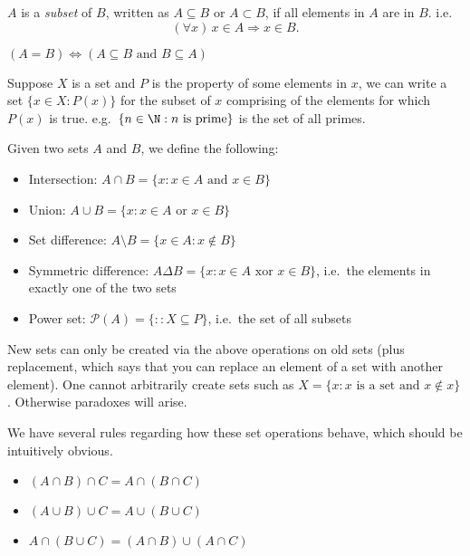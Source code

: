 \documentclass[a4paper]{article}
\begin{document}
\begin{defi}[Subsets]
  $A$ is a \emph{subset} of $B$, written as $A\subseteq B$ or $A\subset B$, if all elements in $A$ are in $B$. i.e.
  \[
    (\forall x)\,x\in A\Rightarrow x\in B.
  \]
\end{defi}

\begin{thm}
  $(A=B)\Leftrightarrow (A\subseteq B \text{ and }B\subseteq A)$
\end{thm}

Suppose $X$ is a set and $P$ is the property of some elements in $x$, we can write a set $\{x\in X:P(x)\}$ for the subset of $x$ comprising of the elements for which $P(x)$ is true. e.g.\ $\{n\in \N : n \text{ is prime}\}$ is the set of all primes.

\begin{defi}
  Given two sets $A$ and $B$, we define the following:
  \begin{itemize}
    \item Intersection: $A\cap B = \{x:x\in A \text{ and } x\in B\}$
    \item Union: $A\cup B = \{x:x\in A\text{ or }x\in B\}$
    \item Set difference: $A\setminus B = \{x\in A: x\not\in B\}$
    \item Symmetric difference: $A\Delta B = \{x: x\in A\text{ xor } x\in B\}$, i.e.\ the elements in exactly one of the two sets
    \item Power set: $\mathcal{P}(A) = \{:: X\subseteq P\}$, i.e.\ the set of all subsets
  \end{itemize}
\end{defi}

New sets can only be created via the above operations on old sets (plus replacement, which says that you can replace an element of a set with another element). One cannot arbitrarily create sets such as $X=\{x:x\text{ is a set and }x\not\in x\}$. Otherwise paradoxes will arise.

We have several rules regarding how these set operations behave, which should be intuitively obvious.
\begin{prop}\leavevmode
  \begin{itemize}
    \item $(A\cap B)\cap C = A \cap (B\cap C)$
    \item $(A\cup B)\cup C = A\cup (B\cup C)$
    \item $A\cap(B\cup C) = (A\cap B)\cup (A\cap C)$
  \end{itemize}
\end{prop}
\end{document}
